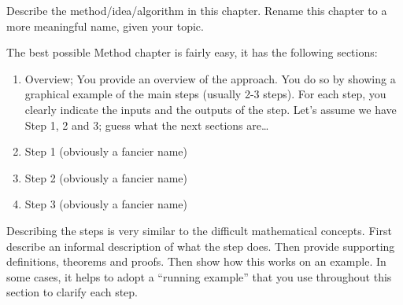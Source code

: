 Describe the method/idea/algorithm in this chapter.
Rename this chapter to a more meaningful name, given your topic.

The best possible Method chapter is fairly easy, it has the following sections:
\begin{enumerate}
    \item Overview; You provide an overview of the approach. You do so by showing a graphical example of the main steps (usually 2-3 steps).
    For each step, you clearly indicate the inputs and the outputs of the step. Let's assume we have Step 1, 2 and 3; guess what the next sections are\dots
    \item Step 1 (obviously a fancier name)
    \item Step 2 (obviously a fancier name)
    \item Step 3 (obviously a fancier name)
\end{enumerate}
Describing the steps is very similar to the difficult mathematical concepts.
First describe an informal description of what the step does.
Then provide supporting definitions, theorems and proofs.
Then show how this works on an example.
In some cases, it helps to adopt a \enquote{running example} that you use throughout this section to clarify each step.